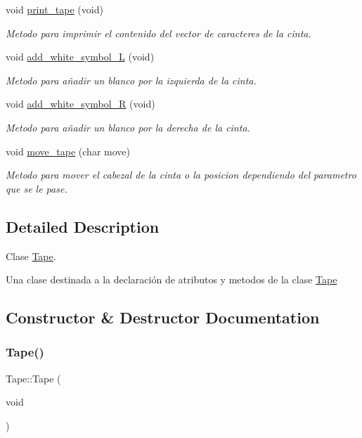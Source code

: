 \begin{DoxyCompactItemize}
void \hyperlink{class_tape_ae7b2c05c9abe984b55fb337c2a12f37d}{print\+\_\+tape} (void)
\begin{DoxyCompactList}\small\item\em Metodo para imprimir el contenido del vector de caracteres de la cinta. \end{DoxyCompactList}\item 
void \hyperlink{class_tape_a99d0cd086b4ccb83e0f2590796f8dacc}{add\+\_\+white\+\_\+symbol\+\_\+L} (void)
\begin{DoxyCompactList}\small\item\em Metodo para añadir un blanco por la izquierda de la cinta. \end{DoxyCompactList}\item 
void \hyperlink{class_tape_ae687a3b6a936925e200e38d68d402fa6}{add\+\_\+white\+\_\+symbol\+\_\+R} (void)
\begin{DoxyCompactList}\small\item\em Metodo para añadir un blanco por la derecha de la cinta. \end{DoxyCompactList}\item 
void \hyperlink{class_tape_a66ca6d38274b63476f8b7313a7de6de2}{move\+\_\+tape} (char move)
\begin{DoxyCompactList}\small\item\em Metodo para mover el cabezal de la cinta o la posicion dependiendo del parametro que se le pase. \end{DoxyCompactList}\end{DoxyCompactItemize}


\subsection{Detailed Description}
Clase \hyperlink{class_tape}{Tape}. 

Una clase destinada a la declaración de atributos y metodos de la clase \hyperlink{class_tape}{Tape} 

\subsection{Constructor \& Destructor Documentation}
\hypertarget{class_tape_a18f34a19a5f5f1b9602a73696bfd7556}{}\label{class_tape_a18f34a19a5f5f1b9602a73696bfd7556} 
\subsubsection{\texorpdfstring{Tape()}{Tape()}}
{\footnotesize\ttfamily Tape\+::\+Tape (\begin{DoxyParamCaption}\item[{void}]{ }\end{DoxyParamCaption})}




